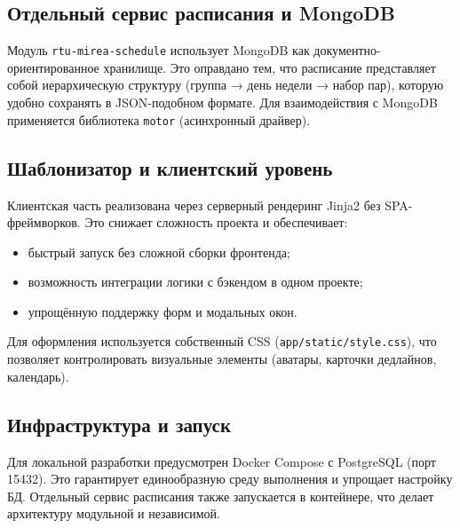 \subsection{Отдельный сервис расписания и MongoDB}

Модуль \texttt{rtu-mirea-schedule} использует MongoDB как документно-ориентированное хранилище. Это оправдано тем, что расписание представляет собой иерархическую структуру (группа → день недели → набор пар), которую удобно сохранять в JSON-подобном формате. Для взаимодействия с MongoDB применяется библиотека \texttt{motor} (асинхронный драйвер).

\subsection{Шаблонизатор и клиентский уровень}

Клиентская часть реализована через серверный рендеринг Jinja2 без SPA-фреймворков. Это снижает сложность проекта и обеспечивает:
\begin{itemize}
    \item быстрый запуск без сложной сборки фронтенда;
    \item возможность интеграции логики с бэкендом в одном проекте;
    \item упрощённую поддержку форм и модальных окон.
\end{itemize}
Для оформления используется собственный CSS (\texttt{app/static/style.css}), что позволяет контролировать визуальные элементы (аватары, карточки дедлайнов, календарь).

\subsection{Инфраструктура и запуск}

Для локальной разработки предусмотрен Docker Compose с PostgreSQL (порт 15432). Это гарантирует единообразную среду выполнения и упрощает настройку БД. Отдельный сервис расписания также запускается в контейнере, что делает архитектуру модульной и независимой.
